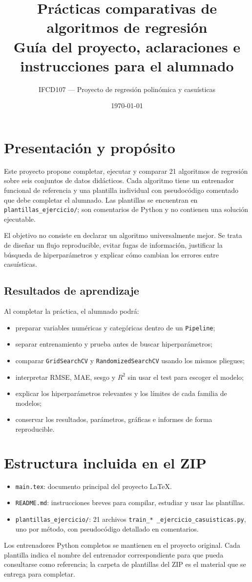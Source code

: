 \documentclass[11pt,a4paper]{article}
\title{\textbf{Prácticas comparativas de algoritmos de regresión}\\
\large Guía del proyecto, aclaraciones e instrucciones para el alumnado}
\author{IFCD107 — Proyecto de regresión polinómica y casuísticas}
\date{\today}
\begin{document}
\maketitle
\tableofcontents
\newpage

\section{Presentación y propósito}
Este proyecto propone completar, ejecutar y comparar 21 algoritmos de regresión sobre seis conjuntos de datos didácticos. Cada algoritmo tiene un entrenador funcional de referencia y una plantilla individual con pseudocódigo comentado que debe completar el alumnado. Las plantillas se encuentran en \texttt{plantillas\_ejercicio/}; son comentarios de Python y no contienen una solución ejecutable.

El objetivo no consiste en declarar un algoritmo universalmente mejor. Se trata de diseñar un flujo reproducible, evitar fugas de información, justificar la búsqueda de hiperparámetros y explicar cómo cambian los errores entre casuísticas.

\subsection{Resultados de aprendizaje}
Al completar la práctica, el alumnado podrá:
\begin{itemize}
\item preparar variables numéricas y categóricas dentro de un \texttt{Pipeline};
\item separar entrenamiento y prueba antes de buscar hiperparámetros;
\item comparar \texttt{GridSearchCV} y \texttt{RandomizedSearchCV} usando los mismos pliegues;
\item interpretar RMSE, MAE, sesgo y $R^2$ sin usar el test para escoger el modelo;
\item explicar los hiperparámetros relevantes y los límites de cada familia de modelos;
\item conservar los resultados, parámetros, gráficas e informes de forma reproducible.
\end{itemize}

\section{Estructura incluida en el ZIP}
\begin{itemize}
\item \texttt{main.tex}: documento principal del proyecto LaTeX.
\item \texttt{README.md}: instrucciones breves para compilar, estudiar y usar las plantillas.
\item \texttt{plantillas\_ejercicio/}: 21 archivos \texttt{train\_* \_ejercicio\_casuisticas.py}, uno por método, con pseudocódigo detallado en comentarios.
\end{itemize}
Los entrenadores Python completos se mantienen en el proyecto original. Cada plantilla indica el nombre del entrenador correspondiente para que pueda consultarse como referencia; la carpeta de plantillas del ZIP es el material que se entrega para completar.
\end{document}
